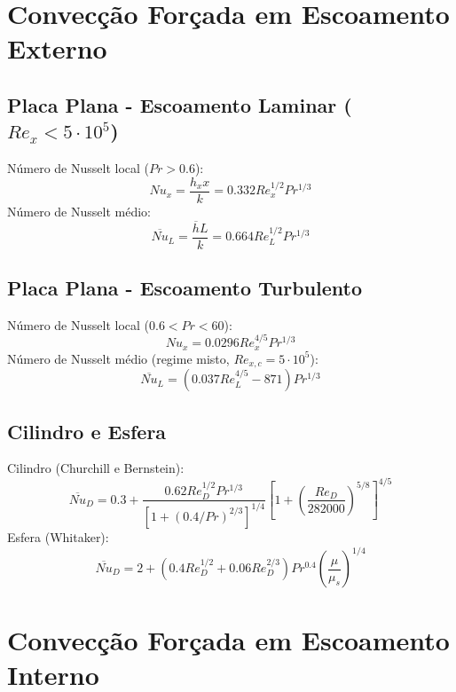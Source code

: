 \documentclass[12pt, a4paper]{article}
\begin{document}
\newpage

\section{Convecção Forçada em Escoamento Externo}

\subsection{Placa Plana - Escoamento Laminar ($Re_x < 5 \cdot 10^5$)}
Número de Nusselt local ($Pr > 0.6$):
\begin{equation}
    Nu_x = \frac{h_x x}{k} = 0.332 Re_x^{1/2} Pr^{1/3}
\end{equation}
Número de Nusselt médio:
\begin{equation}
    \overline{Nu}_L = \frac{\overline{h}L}{k} = 0.664 Re_L^{1/2} Pr^{1/3}
\end{equation}

\subsection{Placa Plana - Escoamento Turbulento}
Número de Nusselt local ($0.6 < Pr < 60$):
\begin{equation}
    Nu_x = 0.0296 Re_x^{4/5} Pr^{1/3}
\end{equation}
Número de Nusselt médio (regime misto, $Re_{x,c} = 5 \cdot 10^5$):
\begin{equation}
    \overline{Nu}_L = (0.037 Re_L^{4/5} - 871) Pr^{1/3}
\end{equation}

\subsection{Cilindro e Esfera}
Cilindro (Churchill e Bernstein):
\begin{equation}
    \overline{Nu}_D = 0.3 + \frac{0.62 Re_D^{1/2} Pr^{1/3}}{[1+(0.4/Pr)^{2/3}]^{1/4}} \left[1 + \left(\frac{Re_D}{282000}\right)^{5/8}\right]^{4/5}
\end{equation}
Esfera (Whitaker):
\begin{equation}
    \overline{Nu}_D = 2 + (0.4 Re_D^{1/2} + 0.06 Re_D^{2/3})Pr^{0.4}\left(\frac{\mu}{\mu_s}\right)^{1/4}
\end{equation}

\newpage

\section{Convecção Forçada em Escoamento Interno}
\end{document}
